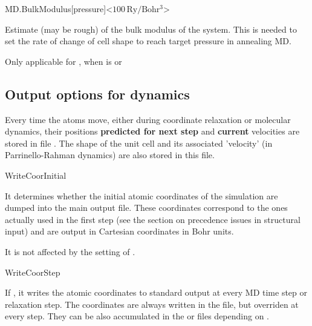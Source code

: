\begin{fdfentry}{MD.BulkModulus}[pressure]<$100\,\mathrm{Ry/Bohr^3}$>  

  Estimate (may be rough) of the bulk modulus of the system.  This is
  needed to set the rate of change of cell shape to reach target
  pressure in annealing MD.

  Only applicable for  , when
   is  or 

\end{fdfentry}



\subsection{Output options for dynamics}

Every time the atoms move, either during coordinate relaxation or
molecular dynamics, their positions \textbf{predicted for next step}
and \textbf{current} velocities are stored in file . The
shape of the unit cell and its associated 'velocity' (in
Parrinello-Rahman dynamics) are also stored in this file.

\begin{fdflogicalT}{WriteCoorInitial}

  It determines whether the initial atomic coordinates of the
  simulation are dumped into the main output file. These coordinates
  correspond to the ones actually used in the first step (see the
  section on precedence issues in structural input) and are output in
  Cartesian coordinates in Bohr units.

  It is not affected by the setting of .

\end{fdflogicalT}


\begin{fdflogicalF}{WriteCoorStep}
  
  If \fdftrue, it writes the atomic coordinates to standard
  output at every MD time step or relaxation step. The coordinates are
  always written in the  file, but overriden at
  every step. They can be also accumulated in the 
  or  files depending on .

\end{fdflogicalF}

